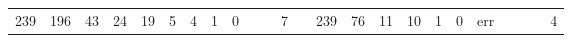 {\begin{tabular}{cccccccccccclccccccccccc}
239                                                & 196                                                & 43                                               & 24                                               & 19                                               & 5                                                & 4                                               & 1                                               & 0                                               &                                                 &                                                 & 7                                                &                          & 239                                                & 76                                                 & 11                                               & 10                                               & 1                                               & 0                                               & err                                             &                                                 &                                                 &                                                 & 4                                               
\end{tabular}%
}



